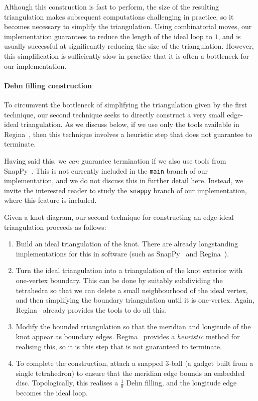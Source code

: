 \documentclass[a4paper,UKenglish,cleveref, autoref, thm-restate]{lipics-v2021}
\begin{document}
Although this construction is fast to perform, the size of the resulting triangulation makes
subsequent computations challenging in practice, so it becomes necessary to simplify the triangulation.
Using combinatorial moves, our implementation guarantees to reduce the length of the ideal loop to $1$, and is usually successful at significantly reducing the size of the triangulation.
However, this simplification is sufficiently slow in practice that it is often a bottleneck for our implementation.

\paragraph*{Dehn filling construction}

To circumvent the bottleneck of simplifying the triangulation given by the first technique,
our second technique seeks to directly construct a very small edge-ideal triangulation.
As we discuss below, if we use only the tools available in Regina~\cite{Regina}, then this
technique involves a heuristic step that does not guarantee to terminate.

Having said this, we \emph{can} guarantee termination if we also use tools from
SnapPy~\cite{SnapPy}. This is not currently included in the \texttt{main} branch of our
implementation, and we do not discuss this in further detail here. Instead, we invite the
interested reader to study the \texttt{snappy} branch of our implementation, where this
feature is included.

Given a knot diagram, our second technique for constructing an edge-ideal triangulation proceeds as follows:
\begin{enumerate}
\item
Build an ideal triangulation of the knot.
There are already longstanding implementations for this in software (such as SnapPy~\cite{SnapPy} and Regina~\cite{Regina}).
\item
Turn the ideal triangulation into a triangulation of the knot exterior with one-vertex boundary.
This can be done by suitably subdividing the tetrahedra so that we can delete a small neighbourhood of the ideal vertex,
and then simplifying the boundary triangulation until it is one-vertex.
Again, Regina~\cite{Regina} already provides the tools to do all this.
\item
Modify the bounded triangulation so that the meridian and longitude of the knot appear as boundary edges.
Regina~\cite{Regina} provides a \emph{heuristic} method for realising this, so it is this step that is not guaranteed to terminate.
\item
To complete the construction, attach a snapped $3$-ball (a gadget built from a single tetrahedron) to ensure that the meridian edge bounds an embedded disc.
Topologically, this realises a $\frac{1}{0}$ Dehn filling, and the longitude edge becomes the ideal loop.
\end{enumerate}
\end{document}
